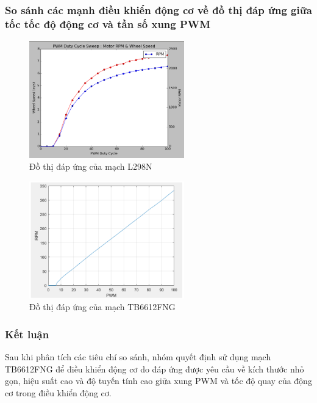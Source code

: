             \subsubsection{So sánh các mạnh điều khiển động cơ về đồ thị đáp ứng giữa tốc tốc độ động cơ và tần số xung PWM}
                \begin{figure}[H]
                    \centering
                    \includegraphics[width=0.6\textwidth]{pictures/chapter2/chapter2_pic_12.png}
                    \caption{Đồ thị đáp ứng của mạch L298N}
                    \label{fig:l298n_response}
                \end{figure}
                \begin{figure}[H]
                    \centering
                    \includegraphics[width=0.6\textwidth]{pictures/chapter2/chapter2_pic_13.png}
                    \caption{Đồ thị đáp ứng của mạch TB6612FNG}
                    \label{fig:tb6612fng_response}
                \end{figure}
            \subsubsection{Kết luận}
                \hspace*{0.6cm}Sau khi phân tích các tiêu chí so sánh, nhóm quyết định sử dụng mạch TB6612FNG để điều khiển động cơ do đáp ứng được yêu cầu về kích thước nhỏ gọn, hiệu suất cao và độ tuyến tính cao giữa xung PWM và tốc độ quay của động cơ trong điều khiển động cơ.
